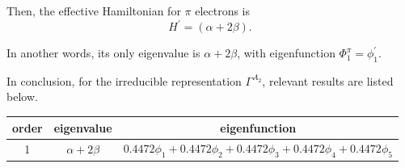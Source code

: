 		Then, the effective Hamiltonian for $\pi$ electrons is
		\begin{equation*}
			H^\prime = ( \alpha + 2\beta ).		
		\end{equation*}
		
		In another words, its only eigenvalue is $\alpha + 2\beta$, with eigenfunction $\Phi^\pi_1 = \phi^\prime_1$.
		
		In conclusion, for the irreducible representation $\Gamma^{A_2}$, relevant results are listed below.
		
		\begin{center}
		\setlength{\abovecaptionskip}{0em}
		\begin{tabular}{ccc}\hline
		  order	&	eigenvalue		& 	eigenfunction	\\ \hline
			1	&$\alpha+2\beta$& 	$0.4472\phi_1 + 0.4472 \phi_2 + 0.4472 \phi_3 + 0.4472 \phi_4 + 0.4472 \phi_5$ \\ \hline
		\end{tabular}
		\end{center}
		
